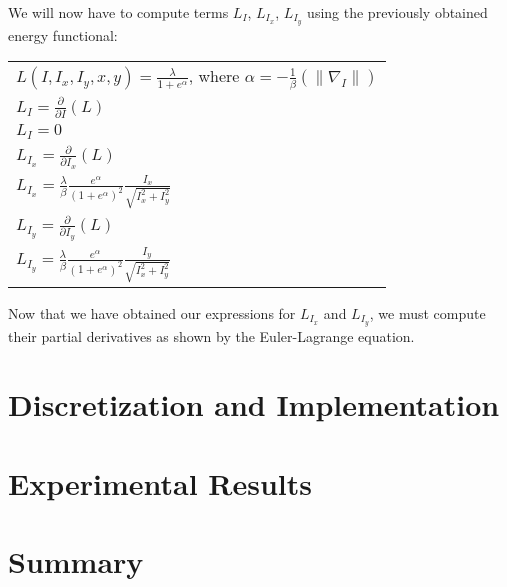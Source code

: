 \documentclass{article}
\begin{document}
    \noindent
    We will now have to compute terms $L_{I}$, $L_{I_{x}}$, $L_{I_{y}}$ using the previously obtained energy functional:
      \begin{center}
        \begin{tabular}{l}
          \vspace{12pt}
          $L(I,I_{x},I_{y},x,y) = \frac{\lambda}{1+e^{\alpha}}$, where $\alpha = -\frac{1}{\beta}(\| \nabla_{I} \|)$\\
          
          $L_{I} = \frac{\partial}{\partial I}(L)$\\
          $L_{I} = 0$\\
          
          $L_{I_{x}} = \frac{\partial}{\partial I_{x}}(L)$\\
          $L_{I_{x}} = \frac{\lambda}{\beta}      \frac{e^\alpha}{(1+e^{\alpha})^2}       \frac{I_{x}}{\sqrt{I_{x}^2 + I_{y}^2}}$\\

          $L_{I_{y}} = \frac{\partial}{\partial I_{y}}(L)$\\
          $L_{I_{y}} = \frac{\lambda}{\beta}      \frac{e^\alpha}{(1+e^{\alpha})^2}       \frac{I_{y}}{\sqrt{I_{x}^2 + I_{y}^2}}$\\
        \end{tabular}
      \end{center}

      \noindent
      Now that we have obtained our expressions for $L_{I_{x}}$ and $L_{I_{y}}$, we must compute their partial derivatives
      as shown by the Euler-Lagrange equation.










  \section{Discretization and Implementation}


  \section{Experimental Results}


  \section{Summary}
\end{document}
